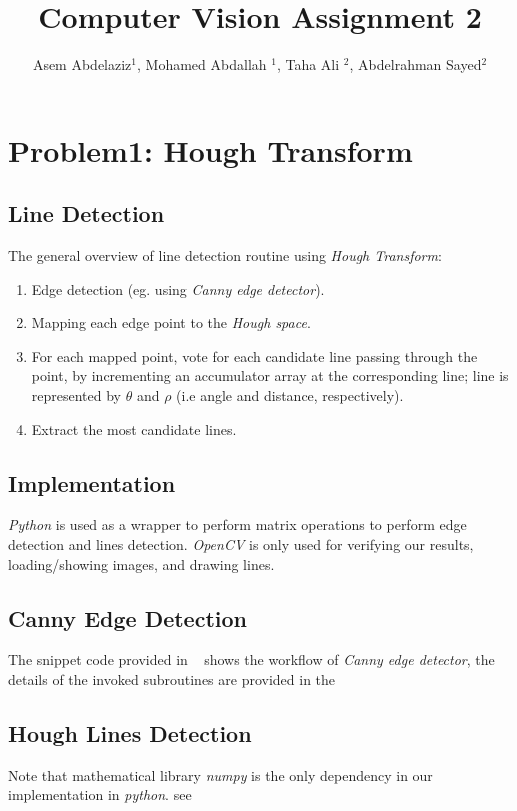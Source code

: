 \documentclass[journal,9pt,onecolumn,draftclsnofoot]{ieeeconf} %
\title{\LARGE \bf
Computer Vision Assignment 2
}
\author{
 Asem Abdelaziz$^{1}$,
 Mohamed Abdallah  $^{1}$, 
 Taha Ali $^{2}$,
 Abdelrahman Sayed$^{2}$
}
\begin{document}
\maketitle
\thispagestyle{empty}
\pagestyle{empty}


\section*{Problem1: Hough Transform} 
\subsection*{Line Detection} 


The general overview of line detection routine using \textit{Hough Transform}:
\begin{enumerate}

\item Edge detection (eg. using \textit{Canny edge detector}).
\item Mapping each edge point to the \textit{Hough space}.
\item For each mapped point, vote for each candidate line passing through the point, by incrementing an accumulator array at the corresponding line; line is represented by $\theta$ and $\rho$ (i.e angle and distance, respectively).
\item Extract the most candidate lines.

\end{enumerate} 
\subsection*{Implementation}

\textit{Python} is used as a wrapper to perform matrix operations to perform edge detection and lines detection. \textit{OpenCV} is only used for verifying our results, loading/showing images, and drawing lines.


\subsection*{Canny Edge Detection}
The snippet code provided in ~ shows the workflow of \textit{Canny edge detector}, the details of the invoked subroutines are provided in the ~ 

\subsection*{ Hough Lines Detection }
Note that mathematical library \textit{numpy} is the only dependency in our implementation in \textit{python}. see ~
\end{document}
